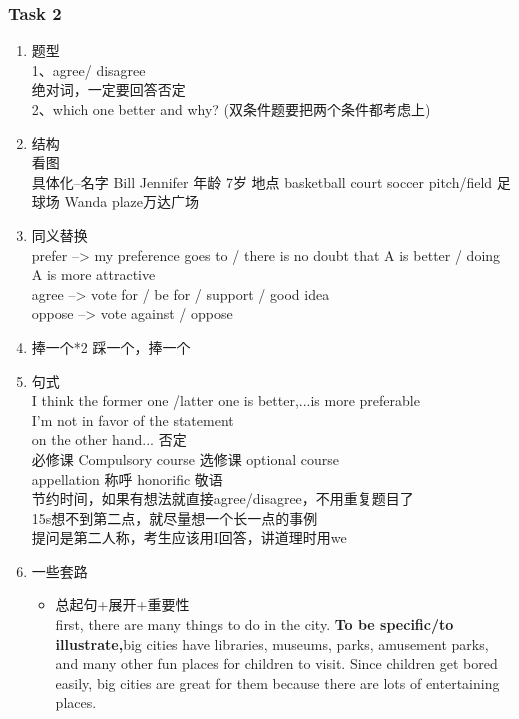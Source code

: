 \documentclass[UTF8]{ctexart}
\begin{document}
\subsubsection{Task 2}
\begin{enumerate}[A]
  \item 题型\\
  1、agree/ disagree\\
  绝对词，一定要回答否定\\
  2、which one better and why? (双条件题要把两个条件都考虑上)\\
  \item 结构\\
  看图\\
  具体化--名字 Bill Jennifer 年龄 7岁 地点 basketball court soccer pitch/field 足球场 Wanda plaze万达广场 \\
  \item 同义替换\\
  prefer --> my preference goes to / there is no doubt that A is better / doing A is more attractive \\
  agree --> vote for / be for / support / good idea\\
  oppose --> vote against / oppose
  \item 捧一个*2 踩一个，捧一个\\
  \item 句式\\
  I think the former one /latter one is better,...is more preferable\\
  I'm not in favor of the statement\\
  on the other hand... 否定\\
  必修课 Compulsory course 选修课 optional course\\
  appellation 称呼 honorific 敬语 \\
  节约时间，如果有想法就直接agree/disagree，不用重复题目了\\
  15s想不到第二点，就尽量想一个长一点的事例\\
  提问是第二人称，考生应该用I回答，讲道理时用we\\
  \item 一些套路
  \begin{itemize}
    \item 总起句+展开+重要性\\
    first, there are many things to do in the city. \textbf{To be specific/to illustrate,}big cities have libraries, museums, parks, amusement parks, and many other fun places for children to visit. Since children get bored easily, big cities are great for them because there are lots of entertaining places.
  \end{itemize}
\end{enumerate}
\end{document}
